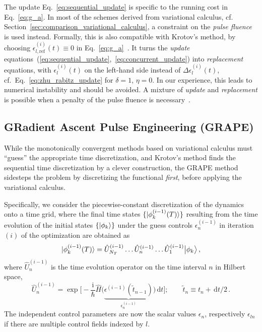 \documentclass[submission, Phys]{SciPost}
\newcommand{\Op}[1]{\hat{#1}}
\newcommand{\dd}[0]{\,\text{d}}
\begin{document}
The update Eq.~\eqref{eq:sequential_update} is specific to the running cost in
Eq.~\eqref{eq:g_a}.
In most of the schemes derived from variational calculus, cf.
Section~\ref{sec:comparison_variational_calculus}, a constraint on the
\emph{pulse fluence} is used instead.
Formally, this is also compatible with Krotov's method, by choosing
$\epsilon_{l, \text{ref}}^{(i)}(t) \equiv 0$ in
Eq.~\eqref{eq:g_a}~\cite{PalaoPRL2002}.
It turns the \emph{update}
equations~(\ref{eq:sequential_update},~\ref{eq:concurrent_update}) into
\emph{replacement} equations, with $\epsilon_l^{(i)}(t)$ on the left-hand side
instead of $\Delta\epsilon_l^{(i)}(t)$, cf.~Eq.~\eqref{eq:zhu_rabitz_update} for
$\delta = 1$, $\eta = 0$.
In our experience, this leads to numerical instability and should be avoided.
A mixture of \emph{update} and \emph{replacement} is possible when a penalty of
the pulse fluence is necessary~\cite{GoerzPhd2015}.


\subsection{GRadient Ascent Pulse Engineering (GRAPE)}%
\label{sec:comparison_grape}

While the monotonically convergent methods based on variational calculus must
``guess'' the appropriate time discretization, and Krotov's method finds the
sequential time discretization by a clever construction, the GRAPE method
sidesteps the problem by discretizing the functional \emph{first}, before
applying the variational calculus.

Specifically, we consider the piecewise-constant discretization of the dynamics
onto a time grid, where the final time states $\{\ket{\phi_k^{(i-1)}(T)}\}$
resulting from the time evolution of the initial states $\{\ket{\phi_k}\}$ under
the guess controls $\epsilon^{(i-1)}_n$ in iteration $(i)$ of the optimization
are obtained as
\begin{equation}%
\label{eq:discrete_time_evolution} \ket{\phi^{(i-1)}_k(T)} = \Op{U}^{(i-1)}_{N_T} \dots
\Op{U}^{(i-1)}_{n} \dots \Op{U}^{(i-1)}_{1} \big\vert \phi_k \big\rangle\,,
\end{equation}
where  $\Op{U}^{(i-1)}_{n}$ is the time evolution operator on the time interval
$n$ in Hilbert space,
\begin{equation}
\Op{U}^{(i-1)}_{n} = \exp\Bigg[ -\frac{\mathrm{i}}{\hbar} \Op{H}\big(
\underbrace{\epsilon^{(i-1)}(\tilde t_{n-1})}_{\epsilon^{(i-1)}_n} \big) \dd
t\Bigg];\qquad \tilde{t}_n \equiv t_n + \dd t / 2\,.
\end{equation}
The independent control parameters are now the scalar values $\epsilon_n$,
respectively $\epsilon_{ln}$ if there are multiple control fields indexed by
$l$.
\end{document}
